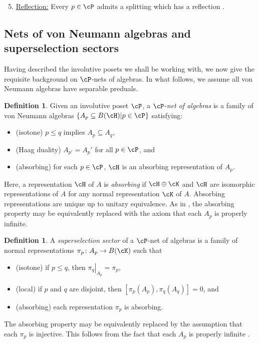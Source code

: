 \documentclass[11pt,reqno]{amsart}
\newcommand{\set}[2]{\left\{#1 \middle| #2\right\}}
\numberwithin{equation}{section}
\theoremstyle{plain}
\theoremstyle{definition}
\newtheorem{definition}[equation]{Definition}
\begin{document}
\begin{enumerate}[label=\textup{(GA\arabic*)}, series=geom]
\setcounter{enumi}{4}
\item 
\label{geom:reflection}
\underline{Reflection:} Every $p\in \cP$ admits a splitting which has a reflection \cite[Proposition~4.11]{MR4927814}.
\end{enumerate}

\subsection{Nets of von Neumann algebras and superselection sectors}

Having described the involutive posets we shall be working with, we now give the requisite background on $\cP$-nets of algebras.
In what follows, we assume all von Neumann algebras have separable preduals.

\begin{definition}
    Given an involutive poset $\cP$, a $\cP$-\emph{net of algebras} is a family of von Neumann algebras $\set{A_p\subseteq B(\cH)}{p \in \cP}$ satisfying:
    \begin{itemize}
        \item (isotone) $p\leq q$ implies $A_p\subseteq A_q$,
        \item (Haag duality) $A_{p'}=A_p'$ for all $p \in \cP$, and
        \item (absorbing) for each $p \in \cP$, $\cH$ is an absorbing representation of $A_p$.
    \end{itemize}
\end{definition}
Here, a representation $\cH$ of $A$ is \emph{absorbing} if $\cH \oplus \cK$ and $\cH$ are isomorphic representations of $A$ for any normal representation $\cK$ of $A$. Absorbing representations are unique up to unitary equivalence. 
As in \cite[Cor.~2.12]{MR4927814}, the absorbing property may be equivalently replaced with the axiom that each $A_p$ is properly infinite.

\begin{definition}
    A \emph{superselection sector} of a $\cP$-net of algebras is a family of normal representations $\pi_p\colon A_p \to B(\cK)$ such that
    \begin{itemize}
        \item (isotone) if $p\leq q$, then ${\left.{\pi_q}\right|_{A_p}}=\pi_p$,
        \item (local) if $p$ and $q$ are disjoint, then $[\pi_p(A_p),\pi_q(A_q)]=0$, and
        \item (absorbing) each representation $\pi_p$ is absorbing.
    \end{itemize}
\end{definition}
\noindent The absorbing property may be equivalently replaced by the assumption that each $\pi_p$ is injective. 
This follows from the fact that each $A_p$ is properly infinite \cite[Lemmas~2.11 and 2.18]{MR4927814}.
\end{document}
